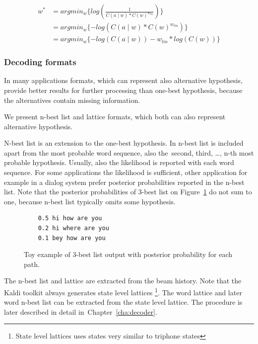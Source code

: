 {\begin{equation}\label{eq:am_lm}
    \begin{split}
        w^* &= argmin_{w}\{log(\frac{1}{C(a \mid w) * C(w)^{w_{lm}}})\} \\
        &= argmin_{w}\{-log(C(a \mid w) * C(w)^{w_{lm}})\} \\
        &= argmin_{w}\{-log(C(a \mid w)) - w_{lm}*log( C(w))\} 
    \end{split}
\end{equation}

\subsubsection*{Decoding formats}
In many applications formats, which can represent also alternative hypothesis,
provide better results for further processing than one-best hypothesis,
because the alternatives contain missing information.

We present n-best list and lattice formats, which both can also represent 
alternative hypothesis.

N-best list is an extension to the one-best hypothesis. 
In n-best list is included apart from the most probable word sequence, also 
the~second, third, \ldots, n-th most probable hypothesis. 
Usually, also the likelihood is reported with each word sequence.
For some applications the likelihood is sufficient,
other application for example in a dialog system prefer
posterior probabilities reported in the n-best list.
Note that the posterior probabilities of 3-best list on Figure~\ref{fig:nbest}
do not sum to one, because n-best list typically omits some hypothesis.

\begin{figure}[!htp]
    \begin{center}
\begin{verbatim}
    0.5 hi how are you
    0.2 hi where are you
    0.1 bey how are you
\end{verbatim}
    \caption{Toy example of 3-best list output with posterior probability for each path.}
    \label{fig:nbest} 
    \end{center}
\end{figure}

The n-best list and lattice are extracted from the beam history.
Note that the Kaldi toolkit always generates state level lattices
\footnote{State level lattices uses states very similar to triphone states}.\cite{povey2012generating} 
The word lattice and later word n-best list can be extracted 
from the state level lattice. 
The procedure is later described in detail in~Chapter~\ref{cha:decoder}.

}
